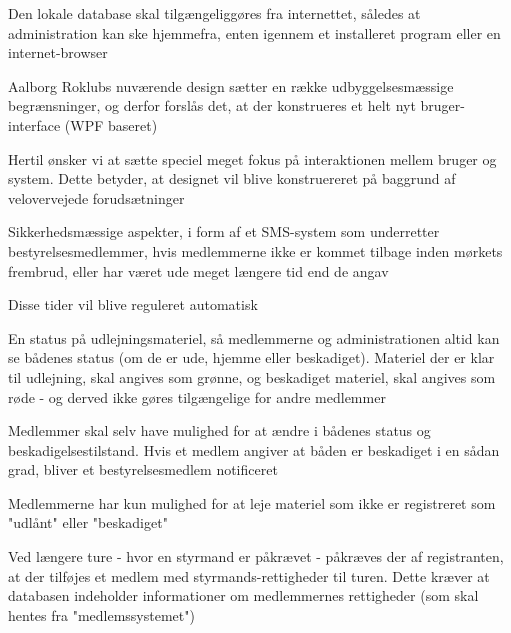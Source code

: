 \begin{itemize_small}

\item Den lokale database skal tilgængeliggøres fra internettet, således at administration kan ske hjemmefra, enten igennem et installeret program eller en internet-browser

\item Aalborg Roklubs nuværende design sætter en række udbyggelsesmæssige begrænsninger, og derfor forslås det, at der konstrueres et helt nyt bruger-interface (WPF baseret)
\begin{itemize_small}
\item Hertil ønsker vi at sætte speciel meget fokus på interaktionen mellem bruger og system. Dette betyder, at designet vil blive konstruereret på baggrund af velovervejede forudsætninger
\end{itemize_small}

\item Sikkerhedsmæssige aspekter, i form af et SMS-system som underretter bestyrelsesmedlemmer, hvis medlemmerne ikke er kommet tilbage inden mørkets frembrud, eller har været ude meget længere tid end de angav
\begin{itemize_small}
\item Disse tider vil blive reguleret automatisk
\end{itemize_small}

\item En status på udlejningsmateriel, så medlemmerne og administrationen altid kan se bådenes status (om de er ude, hjemme eller beskadiget). Materiel der er klar til udlejning, skal angives som grønne, og beskadiget materiel, skal angives som røde - og derved ikke gøres tilgængelige for andre medlemmer
\begin{itemize_small}
\item Medlemmer skal selv have mulighed for at ændre i bådenes status og beskadigelsestilstand. Hvis et medlem angiver at båden er beskadiget i en sådan grad, bliver et bestyrelsesmedlem notificeret
\item Medlemmerne har kun mulighed for at leje materiel som ikke er registreret som "udlånt" eller "beskadiget"
\end{itemize_small}

\item Ved længere ture - hvor en styrmand er påkrævet - påkræves der af registranten, at der tilføjes et medlem med styrmands-rettigheder til turen. Dette kræver at databasen indeholder informationer om medlemmernes rettigheder (som skal hentes fra "medlemssystemet")


\end{itemize_small}
